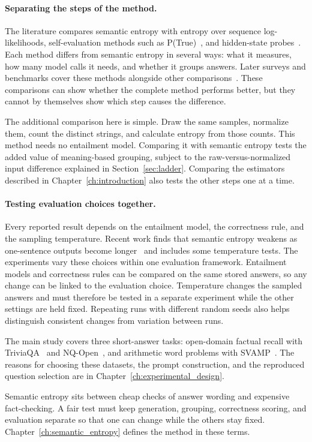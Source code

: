 \paragraph{Separating the steps of the method.} The literature
compares semantic entropy with entropy over sequence log-likelihoods,
self-evaluation methods such as P(True)~\cite{kadavath_language_models_know_2022},
and hidden-state probes~\cite{kossen_semantic_entropy_probes_2024}. Each method
differs from semantic entropy in several ways: what it measures, how many model
calls it needs, and whether it groups answers. Later surveys and benchmarks cover
these methods alongside other comparisons~\cite{shorinwa_uq_llm_survey_2024,%
liu_uq_confidence_calibration_survey_2025,lm_polygraph_vashurin_2025}. These
comparisons can show whether the complete method performs better, but they
cannot by themselves show which step causes the difference.

The additional comparison here is simple. Draw the same samples, normalize them, count
the distinct strings, and calculate entropy from those counts. This method
needs no entailment model. Comparing it with semantic entropy tests the added
value of meaning-based grouping, subject to the raw-versus-normalized input
difference explained in Section~\ref{sec:ladder}.
Comparing the estimators described in Chapter~\ref{ch:introduction} also
tests the other steps one at a time.

\paragraph{Testing evaluation choices together.} Every
reported result depends on the entailment model, the correctness rule, and the
sampling temperature. Recent work finds that semantic entropy weakens as
one-sentence outputs become longer~\cite{nguyen_beyond_semantic_entropy_2025}
and includes some temperature tests. The experiments vary these choices within
one evaluation framework. Entailment models and correctness rules can be compared
on the same stored answers, so any change can
be linked to the evaluation choice. Temperature changes the sampled answers and
must therefore be tested in a separate experiment while the other settings are
held fixed. Repeating runs with different random seeds also helps distinguish
consistent changes from variation between runs.

The main study covers three short-answer tasks: open-domain factual recall with
TriviaQA~\cite{joshi_triviaqa_2017} and NQ-Open~\cite{lee_nq_open_2019}, and
arithmetic word problems with SVAMP~\cite{patel_svamp_2021}. The reasons for
choosing these datasets, the prompt construction, and the
reproduced question selection are in
Chapter~\ref{ch:experimental_design}.

Semantic entropy sits between cheap checks of answer wording and expensive
fact-checking. A fair test must keep generation, grouping, correctness scoring,
and evaluation separate so that one can change while the others stay fixed.
Chapter~\ref{ch:semantic_entropy} defines the method in these terms.
